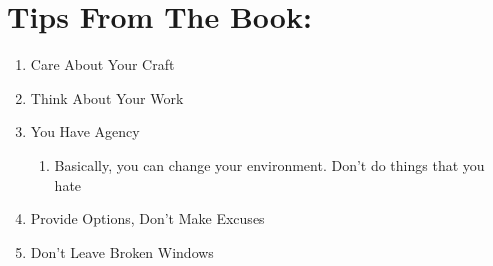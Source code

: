 \documentclass{article}
\begin{document}
\section*{Tips From The Book:}
\begin{enumerate}
    \item Care About Your Craft
    \item Think About Your Work
    \item You Have Agency
        \begin{enumerate}
            \item Basically, you can change your environment. Don't do things that you hate
        \end{enumerate}
    \item Provide Options, Don't Make Excuses
    \item Don't Leave Broken Windows
        \begin{enumerate}


\end{enumerate}
\end{enumerate}
\end{document}
